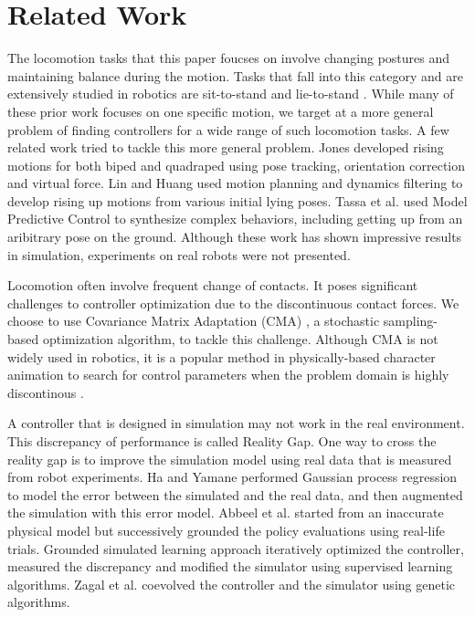\section{Related Work}

The locomotion tasks that this paper foucses on involve changing postures and maintaining balance during the motion. Tasks that fall into this category and are extensively studied in robotics are sit-to-stand \cite{Faloutsos:2003,Iida:2004,Pchelkin:2010,Mistry:2010} and lie-to-stand \cite{morimoto:1998,Faloutsos:2001,Hirukawa:2005,Kanehiro:2007}. While many of these prior work focuses on one specific motion, we target at a more general problem of finding controllers for a wide range of such locomotion tasks. A few related work tried to tackle this more general problem. Jones \cite{jones:2011} developed rising motions for both biped and quadraped using pose tracking, orientation correction and virtual force. Lin and Huang \cite{lin:2012} used motion planning and dynamics filtering to develop rising up motions from various initial lying poses. Tassa et al. \cite{tassa:2012} used Model Predictive Control to synthesize complex behaviors, including getting up from an aribitrary pose on the ground. Although these work has shown impressive results in simulation, experiments on real robots were not presented.

Locomotion often involve frequent change of contacts. It poses significant challenges to controller optimization due to the discontinuous contact forces. We choose to use Covariance Matrix Adaptation (CMA) \cite{Hansen:2009}, a stochastic sampling-based optimization algorithm, to tackle this challenge. Although CMA is not widely used in robotics, it is a popular method in physically-based character animation to search for control parameters when the problem domain is highly discontinous \cite{Wu:2010, Wang:2010, Tan:2014}.

A controller that is designed in simulation may not work in the real environment. This discrepancy of performance is called Reality Gap. One way to cross the reality gap is to improve the simulation model using real data that is measured from robot experiments. Ha and Yamane \cite{HA:2015} performed Gaussian process regression to model the error between the simulated and the real data, and then augmented the simulation with this error model. Abbeel et al. \cite{Abbeel:2006} started from an inaccurate physical model but successively grounded the policy evaluations using real-life trials. Grounded simulated learning approach \cite{Farchy:2013} iteratively optimized the controller, measured the discrepancy and modified the simulator using supervised learning algorithms. Zagal et al. \cite{zagal2004} coevolved the controller and the simulator using genetic algorithms.

